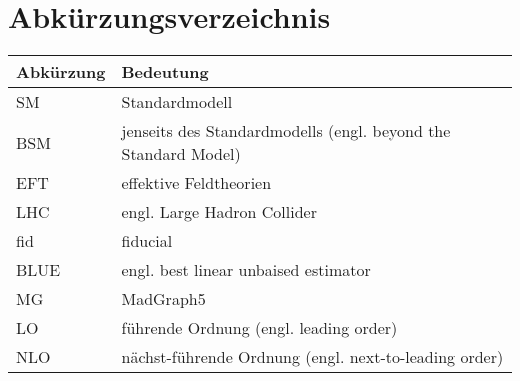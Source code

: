 \chapter{Abkürzungsverzeichnis}
\begin{table}[H]
    \centering
   \begin{tabular}{ll}
     Abkürzung & Bedeutung\\
     \midrule
     SM & Standardmodell\\
     BSM & jenseits des Standardmodells (engl. beyond the Standard Model)\\
     EFT & effektive Feldtheorien\\
     LHC & engl. Large Hadron Collider\\
     fid & fiducial\\
     BLUE & engl. best linear unbaised estimator\\
     MG & MadGraph5\\
     LO & führende Ordnung (engl. leading order)\\
     NLO & nächst-führende Ordnung (engl. next-to-leading order)\\
   \end{tabular}
\end{table}

